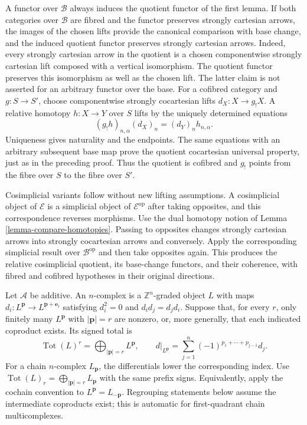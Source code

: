 \begin{remark}
\label{remark-illusie-I-relative-homotopy-base-functor}
A functor over $\mathcal B$ always induces the quotient functor of the
first lemma. If both categories over $\mathcal B$ are fibred and the
functor preserves strongly cartesian arrows, the images
of the chosen lifts provide the canonical comparison with base change,
and the induced quotient functor preserves strongly cartesian arrows.
Indeed, every strongly cartesian arrow in the quotient is a chosen
componentwise strongly cartesian lift composed with a vertical isomorphism.
The quotient functor preserves this isomorphism as well as the chosen lift.
The latter claim is not asserted for an arbitrary functor over the base.
For a cofibred category and $g:S\to S'$, choose componentwise strongly
cocartesian lifts $d_X:X\to g_!X$. A relative homotopy $h:X\to Y$
over $S$ lifts by the uniquely determined equations
$$
(g_!h)_{n,\alpha}(d_X)_n=(d_Y)_nh_{n,\alpha}.
$$
Uniqueness gives naturality and the endpoints. The same equations with an
arbitrary subsequent base map prove the quotient cocartesian universal
property, just as in the preceding proof. Thus the quotient is cofibred
and $g_!$ points from the fibre over $S$ to the fibre over $S'$.

Cosimplicial variants follow without new lifting assumptions. A
cosimplicial object of $\mathcal E$ is a simplicial object of
$\mathcal E^{\mathrm{op}}$ after taking opposites, and this correspondence
reverses morphisms. Use the dual homotopy notion of
Lemma \ref{lemma-compare-homotopies}. Passing to opposites changes
strongly cartesian arrows into strongly cocartesian arrows and conversely.
Apply the corresponding simplicial result over $\mathcal B^{\mathrm{op}}$
and then take opposites again. This produces the relative cosimplicial
quotient, its base-change functors, and their coherence, with fibred
and cofibred hypotheses in their original directions.
\end{remark}

\begin{definition}
\label{definition-illusie-I-signed-total}
Let $\mathcal A$ be additive. An $n$-complex is a $\mathbb Z^n$-graded
object $L$ with maps $d_i:L^{\mathbf p}\to L^{\mathbf p+\mathbf e_i}$
satisfying $d_i^2=0$ and $d_id_j=d_jd_i$. Suppose that, for every $r$,
only finitely many $L^{\mathbf p}$ with $|\mathbf p|=r$ are nonzero, or,
more generally, that each indicated coproduct exists.
Its signed total is
\[
 \operatorname{Tot}(L)^r=\bigoplus_{|\mathbf p|=r}L^{\mathbf p},
 \qquad d|_{L^{\mathbf p}}=\sum_{j=1}^n
 (-1)^{p_1+\cdots+p_{j-1}}d_j.
\]
For a chain $n$-complex $L_{\mathbf p}$, the differentials lower the
corresponding index. Use $\operatorname{Tot}(L)_r=\bigoplus_{|\mathbf p|=r}
L_{\mathbf p}$ with the same prefix signs. Equivalently, apply the cochain
convention to $L^{\mathbf p}=L_{-\mathbf p}$. Regrouping statements below
assume the intermediate coproducts exist; this is automatic for first-quadrant
chain multicomplexes.
\end{definition}

